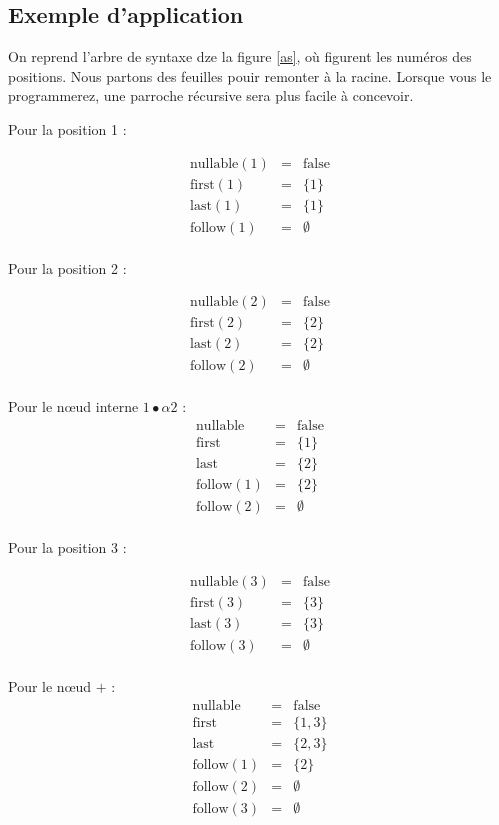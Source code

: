 \documentclass{article}
\begin{document}
\subsection{Exemple d'application}

On reprend l'arbre de syntaxe dze la figure \ref{as}, où figurent les numéros des positions. 
Nous partons des feuilles pouir remonter à la racine. Lorsque vous le programmerez, une parroche récursive sera plus facile à concevoir. 

Pour la position 1 : 

$$\begin{array}{lcl}
\mbox{nullable}(1)&=&\mbox{false}\\
\mbox{first}(1)&=&\{1\}\\
\mbox{last}(1)&=&\{1\}\\
\mbox{follow}(1)&=&\emptyset\\
\end{array}
$$

Pour la position 2 : 

$$\begin{array}{lcl}
\mbox{nullable}(2)&=&\mbox{false}\\
\mbox{first}(2)&=&\{2\}\\
\mbox{last}(2)&=&\{2\}\\
\mbox{follow}(2)&=&\emptyset\\
\end{array}
$$

Pour le n\oe ud interne $1\bullet \alpha2$ : 
$$\begin{array}{lcl}
\mbox{nullable}&=&\mbox{false}\\
\mbox{first}&=&\{1\}\\
\mbox{last}&=&\{2\}\\
\mbox{follow}(1)&=&\{2\}\\
\mbox{follow}(2)&=&\emptyset\\
\end{array}
$$

Pour la position 3 : 

$$\begin{array}{lcl}
\mbox{nullable}(3)&=&\mbox{false}\\
\mbox{first}(3)&=&\{3\}\\
\mbox{last}(3)&=&\{3\}\\
\mbox{follow}(3)&=&\emptyset\\
\end{array}
$$

Pour le n\oe ud $+$ : 
$$\begin{array}{lcl}
\mbox{nullable}&=&\mbox{false}\\
\mbox{first}&=&\{1,3\}\\
\mbox{last}&=&\{2,3\}\\
\mbox{follow}(1)&=&\{2\}\\
\mbox{follow}(2)&=&\emptyset\\
\mbox{follow}(3)&=&\emptyset\\
\end{array}
$$
\end{document}
